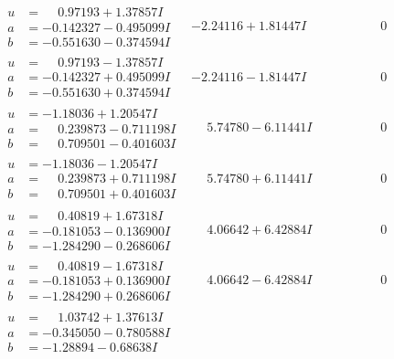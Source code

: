\documentclass[1p]{elsarticle_modified}
\theoremstyle{definition}
\begin{document}
$$\begin{array}{c|c|c}
 \hline 
\begin{aligned}
u &= \phantom{-}0.97193 + 1.37857 I \\
a &= -0.142327 - 0.495099 I \\
b &= -0.551630 - 0.374594 I\end{aligned}
 & -2.24116 + 1.81447 I & \phantom{-0.000000 } 0 \\ \hline\begin{aligned}
u &= \phantom{-}0.97193 - 1.37857 I \\
a &= -0.142327 + 0.495099 I \\
b &= -0.551630 + 0.374594 I\end{aligned}
 & -2.24116 - 1.81447 I & \phantom{-0.000000 } 0 \\ \hline\begin{aligned}
u &= -1.18036 + 1.20547 I \\
a &= \phantom{-}0.239873 - 0.711198 I \\
b &= \phantom{-}0.709501 - 0.401603 I\end{aligned}
 & \phantom{-}5.74780 - 6.11441 I & \phantom{-0.000000 } 0 \\ \hline\begin{aligned}
u &= -1.18036 - 1.20547 I \\
a &= \phantom{-}0.239873 + 0.711198 I \\
b &= \phantom{-}0.709501 + 0.401603 I\end{aligned}
 & \phantom{-}5.74780 + 6.11441 I & \phantom{-0.000000 } 0 \\ \hline\begin{aligned}
u &= \phantom{-}0.40819 + 1.67318 I \\
a &= -0.181053 - 0.136900 I \\
b &= -1.284290 - 0.268606 I\end{aligned}
 & \phantom{-}4.06642 + 6.42884 I & \phantom{-0.000000 } 0 \\ \hline\begin{aligned}
u &= \phantom{-}0.40819 - 1.67318 I \\
a &= -0.181053 + 0.136900 I \\
b &= -1.284290 + 0.268606 I\end{aligned}
 & \phantom{-}4.06642 - 6.42884 I & \phantom{-0.000000 } 0 \\ \hline\begin{aligned}
u &= \phantom{-}1.03742 + 1.37613 I \\
a &= -0.345050 - 0.780588 I \\
b &= -1.28894 - 0.68638 I\end{aligned}

\end{array}$$
\end{document}
